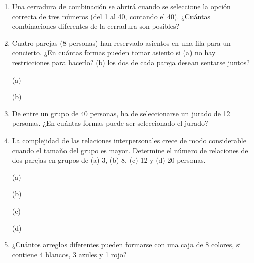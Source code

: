 \documentclass[a4paper, 12pt]{article}
\newcommand{\Pspace}{0.5cm}
\newcommand{\Aspace}{0.2cm}
\begin{document}
\begin{enumerate}
    \item Una cerradura de combinación se abrirá cuando se seleccione la opción correcta de tres números (del 1 al 40, contando el 40). ¿Cuántas combinaciones diferentes de la cerradura son posibles?
    \vspace{\Aspace} \par
    { \color{azul}  }


    \vspace{\Pspace}
    \item Cuatro parejas (8 personas) han reservado asientos en una fila para un concierto. ¿En cuántas formas pueden tomar asiento si (a) no hay restricciones para hacerlo? (b) los dos de cada pareja desean sentarse juntos?
    \vspace{\Aspace} \par
    (a) { \color{azul}  }

    \vspace{\Aspace}
    (b) { \color{azul}  }
    

    \vspace{\Pspace}
    \item De entre un grupo de 40 personas, ha de seleccionarse un jurado de 12 personas. ¿En cuántas formas puede ser seleccionado el jurado?
    \vspace{\Aspace} \par
    { \color{azul}  }

    
    \vspace{\Pspace}
    \item La complejidad de las relaciones interpersonales crece de modo considerable cuando el tamaño del grupo es mayor. Determine el número de relaciones de dos parejas en grupos de (a) 3, (b) 8, (c) 12 y (d) 20 personas.
    \vspace{\Aspace} \par
    (a) { \color{azul}  }
    
    \vspace{\Aspace}
    (b) { \color{azul}  }
    
    \vspace{\Aspace}
    (c) { \color{azul}  }
    
    \vspace{\Aspace}
    (d) { \color{azul}  }


    \vspace{\Pspace}
    \item ¿Cuántos arreglos diferentes pueden formarse con una caja de 8 colores, si contiene 4 blancos, 3 azules y 1 rojo?
    \vspace{\Aspace} \par
    { \color{azul}  }


\end{enumerate}
\end{document}
